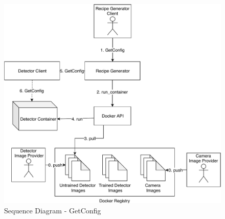 \begin{figure}[ht]
	\centering
  \includegraphics[width=\textwidth]{img/SequenceDiagram-GetConfig.pdf}
	\caption{Sequence Diagram - GetConfig}
	\label{fig:SequenceDiagram-GetConfig}
\end{figure}

